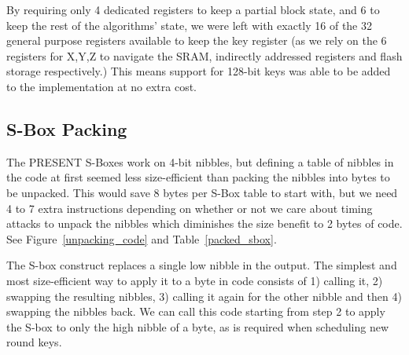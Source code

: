\documentclass[11pt]{llncs2e} %
\begin{document}
By requiring only 4 dedicated registers to keep a partial block state, and 6 to keep the rest of the algorithms' state, we were left with exactly 16 of the 32 general purpose registers available to keep the key register (as we rely on the 6 registers for X,Y,Z to navigate the SRAM, indirectly addressed registers and flash storage respectively.)
This means support for 128-bit keys was able to be added to the implementation at no extra cost.

\subsection{S-Box Packing}\label{sbox_packing}
The PRESENT S-Boxes work on 4-bit nibbles, but defining a table of nibbles in the code at first seemed less size-efficient than packing the nibbles into bytes to be unpacked.
This would save 8 bytes per S-Box table to start with, but we need 4 to 7 extra instructions depending on whether or not we care about timing attacks to unpack the nibbles which diminishes the size benefit to 2 bytes of code. See Figure~\ref{unpacking_code} and Table~\ref{packed_sbox}.


The S-box construct replaces a single low nibble in the output.
The simplest and most size-efficient way to apply it to a byte in code consists of 1) calling it, 2) swapping the resulting nibbles, 3) calling it again for the other nibble and then 4) swapping the nibbles back.
We can call this code starting from step 2 to apply the S-box to only the high nibble of a byte, as is required when scheduling new round keys.
\end{document}
